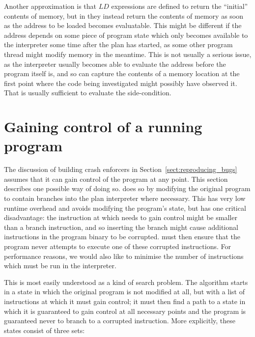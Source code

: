 Another approximation is that $LD$ expressions are defined to return
the ``initial'' contents of memory, but in {\implementation} they
instead return the contents of memory as soon as the address to be
loaded becomes evaluatable.  This might be different if the address
depends on some piece of program state which only becomes available to
the interpreter some time after the plan has started, as some other
program thread might modify memory in the meantime.  This is not
usually a serious issue, as the interpreter usually becomes able to
evaluate the address before the program itself is, and so can capture
the contents of a memory location at the first point where the code
being investigated might possibly have observed it.  That is usually
sufficient to evaluate the side-condition. 

\section{Gaining control of a running program}
\label{sect:enforce:gain_control}

The discussion of building crash enforcers in
Section~\ref{sect:reproducing_bugs} assumes that it can gain control
of the program at any point.  This section describes one possible way
of doing so.  {\Implementation} does so by modifying the original
program to contain branches into the plan interpreter where necessary.
This has very low runtime overhead and avoids modifying the program's
state, but has one critical disadvantage:
the instruction at which {\implementation} needs to gain control might
be smaller than a branch instruction, and so inserting the branch
might cause additional instructions in the program binary to be
corrupted.  {\Implementation} must then ensure that the program never
attempts to execute one of these corrupted instructions.  For
performance reasons, we would also like to minimise the number of
instructions which must be run in the interpreter.

 This is most easily understood as a kind of
search problem\cite{Russell1995}.  The algorithm starts in a state in
which the original program is not modified at all, but with a list of
instructions at which it must gain control; it must then find a path
to a state in which it is guaranteed to gain control at all necessary
points and the program is guaranteed never to branch to a corrupted
instruction.  More explicitly, these states consist of three sets:

